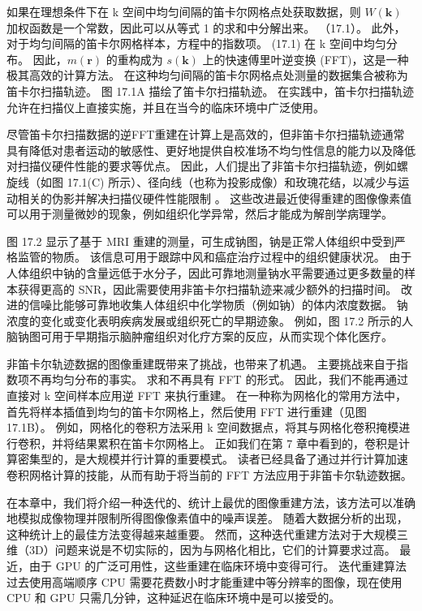 如果在理想条件下在 k 空间中均匀间隔的笛卡尔网格点处获取数据，则 $W(\mathbf{k})$ 加权函数是一个常数，因此可以从等式 1 的求和中分解出来。 （17.1）。 此外，对于均匀间隔的笛卡尔网格样本，方程中的指数项。 (17.1) 在 k 空间中均匀分布。 因此，$m(\mathbf{r})$ 的重构成为 $s(\mathbf{k})$ 上的快速傅里叶逆变换 (FFT)，这是一种极其高效的计算方法。 在这种均匀间隔的笛卡尔网格点处测量的数据集合被称为笛卡尔扫描轨迹。 图 17.1A 描绘了笛卡尔扫描轨迹。 在实践中，笛卡尔扫描轨迹允许在扫描仪上直接实施，并且在当今的临床环境中广泛使用。

尽管笛卡尔扫描数据的逆FFT重建在计算上是高效的，但非笛卡尔扫描轨迹通常具有降低对患者运动的敏感性、更好地提供自校准场不均匀性信息的能力以及降低对扫描仪硬件性能的要求等优点。 因此，人们提出了非笛卡尔扫描轨迹，例如螺旋线（如图 17.1(C) 所示）、径向线（也称为投影成像）和玫瑰花结，以减少与运动相关的伪影并解决扫描仪硬件性能限制 。 这些改进最近使得重建的图像像素值可以用于测量微妙的现象，例如组织化学异常，然后才能成为解剖学病理学。

图 17.2 显示了基于 MRI 重建的测量，可生成钠图，钠是正常人体组织中受到严格监管的物质。 该信息可用于跟踪中风和癌症治疗过程中的组织健康状况。 由于人体组织中钠的含量远低于水分子，因此可靠地测量钠水平需要通过更多数量的样本获得更高的 SNR，因此需要使用非笛卡尔扫描轨迹来减少额外的扫描时间。 改进的信噪比能够可靠地收集人体组织中化学物质（例如钠）的体内浓度数据。 钠浓度的变化或变化表明疾病发展或组织死亡的早期迹象。 例如，图 17.2 所示的人脑钠图可用于早期指示脑肿瘤组织对化疗方案的反应，从而实现个体化医疗。

非笛卡尔轨迹数据的图像重建既带来了挑战，也带来了机遇。 主要挑战来自于指数项不再均匀分布的事实。 求和不再具有 FFT 的形式。 因此，我们不能再通过直接对 k 空间样本应用逆 FFT 来执行重建。 在一种称为网格化的常用方法中，首先将样本插值到均匀的笛卡尔网格上，然后使用 FFT 进行重建（见图 17.1B）。 例如，网格化的卷积方法采用 k 空间数据点，将其与网格化卷积掩模进行卷积，并将结果累积在笛卡尔网格上。 正如我们在第 7 章中看到的，卷积是计算密集型的，是大规模并行计算的重要模式。 读者已经具备了通过并行计算加速卷积网格计算的技能，从而有助于将当前的 FFT 方法应用于非笛卡尔轨迹数据。

在本章中，我们将介绍一种迭代的、统计上最优的图像重建方法，该方法可以准确地模拟成像物理并限制所得图像像素值中的噪声误差。 随着大数据分析的出现，这种统计上的最佳方法变得越来越重要。 然而，这种迭代重建方法对于大规模三维（3D）问题来说是不切实际的，因为与网格化相比，它们的计算要求过高。 最近，由于 GPU 的广泛可用性，这些重建在临床环境中变得可行。 迭代重建算法过去使用高端顺序 CPU 需要花费数小时才能重建中等分辨率的图像，现在使用 CPU 和 GPU 只需几分钟，这种延迟在临床环境中是可以接受的。

